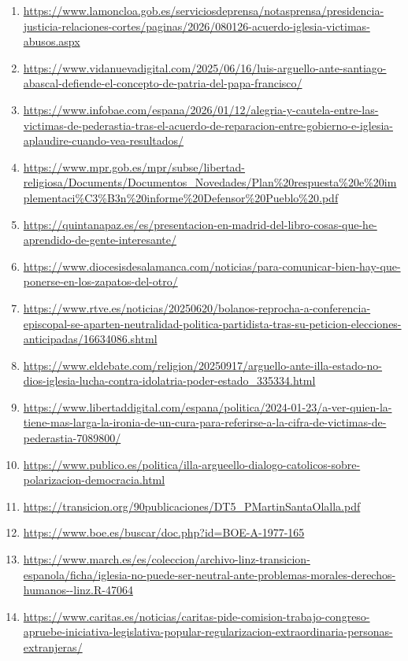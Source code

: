 \documentclass[10pt,a4paper]{article}
\begin{document}
\begin{enumerate}[leftmargin=*]
            \item \url{ https://www.lamoncloa.gob.es/serviciosdeprensa/notasprensa/presidencia-justicia-relaciones-cortes/paginas/2026/080126-acuerdo-iglesia-victimas-abusos.aspx }
            \item \url{ https://www.vidanuevadigital.com/2025/06/16/luis-arguello-ante-santiago-abascal-defiende-el-concepto-de-patria-del-papa-francisco/ }
            \item \url{ https://www.infobae.com/espana/2026/01/12/alegria-y-cautela-entre-las-victimas-de-pederastia-tras-el-acuerdo-de-reparacion-entre-gobierno-e-iglesia-aplaudire-cuando-vea-resultados/ }
            \item \url{ https://www.mpr.gob.es/mpr/subse/libertad-religiosa/Documents/Documentos\_Novedades/Plan\%20respuesta\%20e\%20implementaci\%C3\%B3n\%20informe\%20Defensor\%20Pueblo\%20.pdf }
            \item \url{ https://quintanapaz.es/es/presentacion-en-madrid-del-libro-cosas-que-he-aprendido-de-gente-interesante/ }
            \item \url{ https://www.diocesisdesalamanca.com/noticias/para-comunicar-bien-hay-que-ponerse-en-los-zapatos-del-otro/ }
            \item \url{ https://www.rtve.es/noticias/20250620/bolanos-reprocha-a-conferencia-episcopal-se-aparten-neutralidad-politica-partidista-tras-su-peticion-elecciones-anticipadas/16634086.shtml }
            \item \url{ https://www.eldebate.com/religion/20250917/arguello-ante-illa-estado-no-dios-iglesia-lucha-contra-idolatria-poder-estado\_335334.html }
            \item \url{ https://www.libertaddigital.com/espana/politica/2024-01-23/a-ver-quien-la-tiene-mas-larga-la-ironia-de-un-cura-para-referirse-a-la-cifra-de-victimas-de-pederastia-7089800/ }
            \item \url{ https://www.publico.es/politica/illa-argueello-dialogo-catolicos-sobre-polarizacion-democracia.html }
            \item \url{ https://transicion.org/90publicaciones/DT5\_PMartinSantaOlalla.pdf }
            \item \url{ https://www.boe.es/buscar/doc.php?id=BOE-A-1977-165 }
            \item \url{ https://www.march.es/es/coleccion/archivo-linz-transicion-espanola/ficha/iglesia-no-puede-ser-neutral-ante-problemas-morales-derechos-humanos--linz.R-47064 }
            \item \url{ https://www.caritas.es/noticias/caritas-pide-comision-trabajo-congreso-apruebe-iniciativa-legislativa-popular-regularizacion-extraordinaria-personas-extranjeras/ }

\end{enumerate}
\end{document}
